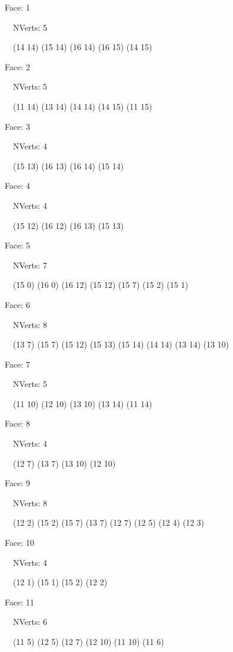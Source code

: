 \documentclass{article}
\begin{document}
{\footnotesize 

Face: 1

\   \    NVerts: 5

 \   \   (14 14) (15 14) (16 14) (16 15) (14 15)}

{\footnotesize 

Face: 2

\   \    NVerts: 5

 \   \   (11 14) (13 14) (14 14) (14 15) (11 15)}

{\footnotesize 

Face: 3

\   \    NVerts: 4

 \   \   (15 13) (16 13) (16 14) (15 14)}

{\footnotesize 

Face: 4

\   \    NVerts: 4

 \   \   (15 12) (16 12) (16 13) (15 13)}

{\footnotesize 

Face: 5

\   \    NVerts: 7

 \   \   (15 0) (16 0) (16 12) (15 12) (15 7) (15 2) (15 1)}

{\footnotesize 

Face: 6

\   \    NVerts: 8

 \   \   (13 7) (15 7) (15 12) (15 13) (15 14) (14 14) (13 14) (13 10)}

{\footnotesize 

Face: 7

\   \    NVerts: 5

 \   \   (11 10) (12 10) (13 10) (13 14) (11 14)}

{\footnotesize 

Face: 8

\   \    NVerts: 4

 \   \   (12 7) (13 7) (13 10) (12 10)}

{\footnotesize 

Face: 9

\   \    NVerts: 8

 \   \   (12 2) (15 2) (15 7) (13 7) (12 7) (12 5) (12 4) (12 3)}

{\footnotesize 

Face: 10

\   \    NVerts: 4

 \   \   (12 1) (15 1) (15 2) (12 2)}

{\footnotesize 

Face: 11

\   \    NVerts: 6

 \   \   (11 5) (12 5) (12 7) (12 10) (11 10) (11 6)}
\end{document}
